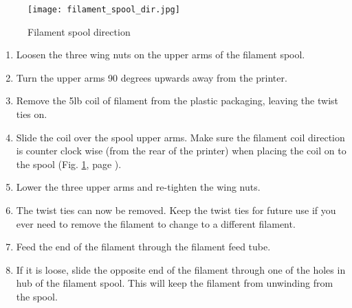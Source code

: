 \begin{figure}[hbt]
\centering
\texttt{[image: filament\_spool\_dir.jpg]}
\caption{Filament spool direction}
\label{fig:filament_spool_dir}
\end{figure}
\begin{enumerate}
\item Loosen the three wing nuts on the upper arms of the filament spool.

\item Turn the upper arms 90 degrees upwards away from the printer.


\item Remove the 5lb coil of filament from the plastic packaging, leaving the twist ties on.

\item Slide the coil over the spool upper arms. Make sure the filament coil direction is counter clock wise (from the rear of the printer) when placing the coil on to the spool
(Fig. \ref{fig:filament_spool_dir}, page \pageref{fig:filament_spool_dir}).

\item Lower the three upper arms and re-tighten the wing nuts.

\item The twist ties can now be removed. Keep the twist ties for future use if you ever need to remove the filament to change to a different filament.

\item Feed the end of the filament through the filament feed tube.

\item If it is loose, slide the opposite end of the filament through one of the holes in hub of the filament spool. This will keep the filament from unwinding from the spool.

\end{enumerate}
